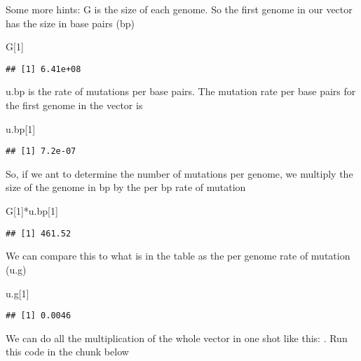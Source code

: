\documentclass[
]{book}
\newenvironment{Shaded}{\begin{snugshade}}{\end{snugshade}}
\newcommand{\DecValTok}[1]{\textcolor[rgb]{0.00,0.00,0.81}{#1}}
\newcommand{\NormalTok}[1]{#1}
\newcommand{\SpecialCharTok}[1]{\textcolor[rgb]{0.00,0.00,0.00}{#1}}
\begin{document}
Some more hints: G is the size of each genome. So the first genome in our vector has the size in base pairs (bp)

\begin{Shaded}
\begin{Highlighting}[]
\NormalTok{G[}\DecValTok{1}\NormalTok{]}
\end{Highlighting}
\end{Shaded}

\begin{verbatim}
## [1] 6.41e+08
\end{verbatim}

u.bp is the rate of mutations per base pairs. The mutation rate per base pairs for the first genome in the vector is

\begin{Shaded}
\begin{Highlighting}[]
\NormalTok{u.bp[}\DecValTok{1}\NormalTok{]}
\end{Highlighting}
\end{Shaded}

\begin{verbatim}
## [1] 7.2e-07
\end{verbatim}

So, if we ant to determine the number of mutations per genome, we multiply the size of the genome in bp by the per bp rate of mutation

\begin{Shaded}
\begin{Highlighting}[]
\NormalTok{G[}\DecValTok{1}\NormalTok{]}\SpecialCharTok{*}\NormalTok{u.bp[}\DecValTok{1}\NormalTok{]}
\end{Highlighting}
\end{Shaded}

\begin{verbatim}
## [1] 461.52
\end{verbatim}

We can compare this to what is in the table as the per genome rate of mutation (u.g)

\begin{Shaded}
\begin{Highlighting}[]
\NormalTok{u.g[}\DecValTok{1}\NormalTok{]}
\end{Highlighting}
\end{Shaded}

\begin{verbatim}
## [1] 0.0046
\end{verbatim}

We can do all the multiplication of the whole vector in one shot like this:
. Run this code in the chunk below
\end{document}
